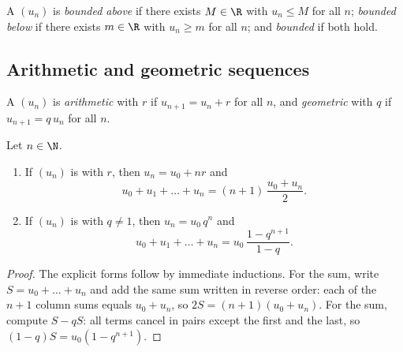 \begin{definition}\label{def:g12:seq:bounded}
A  $(u_n)$ is \emph{bounded above} if there
exists $M \in \R$ with $u_n \leq M$ for all $n$; \emph{bounded below} if there
exists $m \in \R$ with $u_n \geq m$ for all $n$; and \emph{bounded} if both
hold.
\end{definition}

\subsection{Arithmetic and geometric sequences}

\begin{definition}\label{def:g12:seq:arith-geom}
A  $(u_n)$ is \emph{arithmetic} with  $r$ if $u_{n+1} = u_n + r$ for all $n$, and
\emph{geometric} with  $q$ if
$u_{n+1} = q\,u_n$ for all $n$.
\end{definition}

\begin{proposition}\label{prop:g12:seq:arith-geom}
Let $n \in \N$.
\begin{enumerate}
  \item If $(u_n)$ is  with  $r$, then
        $u_n = u_0 + nr$ and
        \[
        u_0 + u_1 + \dots + u_n = (n+1)\,\frac{u_0 + u_n}{2}.
        \]
  \item If $(u_n)$ is  with  $q \neq 1$, then
        $u_n = u_0\, q^n$ and
        \[
        u_0 + u_1 + \dots + u_n = u_0\,\frac{1 - q^{n+1}}{1 - q}.
        \]
\end{enumerate}
\end{proposition}

\begin{proof}
The explicit forms follow by immediate inductions. For the  sum,
write $S = u_0 + \dots + u_n$ and add the same sum written in reverse order:
each of the $n+1$ column sums equals $u_0 + u_n$, so $2S = (n+1)(u_0+u_n)$.
For the  sum, compute $S - qS$: all terms cancel in pairs except the
first and the last, so $(1-q)S = u_0(1 - q^{n+1})$.
\end{proof}

